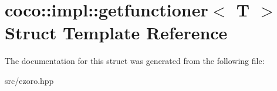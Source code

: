 \hypertarget{structcoco_1_1impl_1_1getfunctioner}{\section{coco\-:\-:impl\-:\-:getfunctioner$<$ T $>$ Struct Template Reference}
\label{structcoco_1_1impl_1_1getfunctioner}
}


The documentation for this struct was generated from the following file\-:\begin{DoxyCompactItemize}
\item 
src/ezoro.\-hpp\end{DoxyCompactItemize}
